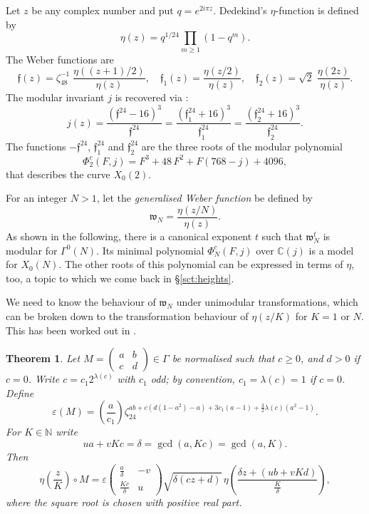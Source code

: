 \documentclass[12pt,twoside,leqno]{article}
\newtheorem{theorem}{Theorem}[section]
\numberwithin{equation}{section}
\renewcommand{\geq}{\geqslant}
\newcommand{\legendre}[2]{\genfrac {(}{)}{1pt}{}{#1}{#2}}
\newcommand{\w}{\mathfrak w}
\newcommand{\N}{\mathbb N}
\newcommand{\C}{\mathbb C}
\newcommand{\wf}{\mathfrak{f}}
\newcommand{\wfone}{\mathfrak{f}_1}
\newcommand{\wftwo}{\mathfrak{f}_2}
\begin{document}
Let $z$ be any complex number and put $q=e^{2 i \pi z}$. Dedekind's
$\eta$-function is defined by \cite{Dedekind76}
$$\eta(z) =  q^{1/24} \prod_{m \geq 1} (1 - q^m).$$
The Weber functions are \cite[\S~34, p.~114]{Weber02-III}
$$\wf(z) = \zeta_{48}^{-1}\; \frac{\eta((z+1)/2)}{\eta(z)},
\quad\wfone(z) = \frac{\eta(z/2)}{\eta(z)},
\quad\wftwo(z) = \sqrt{2}\; \frac{\eta(2z)}{\eta(z)}.$$
The modular invariant $j$ is recovered via \cite[\S~54, p.~179]{Weber02-III}:
$$j(z) = \frac{(\wf^{24}-16)^3}{\wf^{24}}
= \frac{(\wfone^{24}+16)^3}{\wfone^{24}}
= \frac{(\wftwo^{24}+16)^3}{\wftwo^{24}}.
$$
The functions $-\wf^{24}$, $\wfone^{24}$ and $\wftwo^{24}$ are
the three roots of the modular polynomial
$$\Phi_2^c(F, j) = {F}^{3}+48\,{F}^{2}+F(768-j)+4096,$$
that describes the curve $X_0(2)$.

For an integer $N>1$, let
the \textit{generalised Weber function} be defined by
$$
\w_N=\frac{\eta(z/N)}{\eta(z)}.
$$
As shown in the following, there is a canonical exponent $t$
such that $\w_N^t$ is modular for $\Gamma^0 (N)$. Its minimal polynomial
$\Phi_N^c(F, j)$ over $\C (j)$ is a model for $X_0(N)$. The other
roots of this polynomial can be expressed in terms of $\eta$, too,
a topic to which we come back in \S\ref{sct:heights}.

We need to know the behaviour of $\w_N$ under
unimodular transformations, which can be broken down to the transformation
behaviour of $\eta (z / K)$ for $K = 1$ or $N$. This has been worked out
in \cite [Th.~3]{EnSc05}.

\begin {theorem}
\label {th:transformation}
Let $M = \begin {pmatrix} a & b \\ c & d \end {pmatrix} \in \Gamma$ be
normalised such that $c \geq 0$, and $d >0$ if $c = 0$. Write $c = c_1
2^{\lambda (c)}$ with $c_1$ odd; by convention, $c_1 = \lambda (c) = 1$ if
$c = 0$. Define
\[
\varepsilon (M) = \legendre {a}{c_1} \zeta_{24}^{a b + c (d (1 - a^2) - a)
+ 3 c_1 (a - 1) + \frac {3}{2} \lambda (c) (a^2 - 1)}.
\]
For $K \in \N$ write
\[
u a + v K c = \delta = \gcd (a, Kc) = \gcd (a, K).
\]
Then
\[
\eta \left( \frac {z}{K} \right) \circ M = \varepsilon \begin {pmatrix}
\frac {a}{\delta} & -v \\ \frac {Kc}{\delta} & u \end {pmatrix} \sqrt
{\delta (c z + d)} \, \eta \left( \frac {\delta z + (u b + v K d)}{\frac
{K}{\delta}} \right),
\]
where the square root is chosen with positive real part.
\end {theorem}
\end{document}
